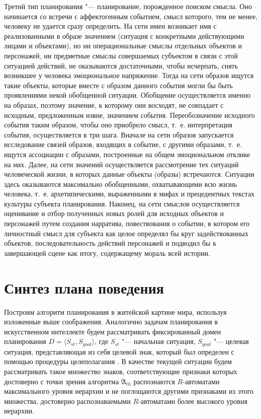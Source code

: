 \documentclass[a4paper, 12pt]{article}
\theoremstyle{break}
\numberwithin{equation}{section}
\begin{document}
	Третий тип планирования "--- планирование, порожденное поиском смысла. Оно начинается со встречи с аффектогенным событием, смысл которого, тем не менее, человеку не удается сразу определить. На сети имен возникает имя с реализованными в образе значением (ситуация с конкретными действующими лицами и объектами), но ни операциональные смыслы отдельных объектов и персонажей, ни предметные смыслы совершаемых субъектом в связи с этой ситуацией действий, не оказываются достаточными, чтобы исчерпать, снять возникшее у человека эмоциональное напряжение. Тогда на сети образов ищутся такие объекты, которые вместе с образом данного события могли бы быть проявлениями некой обобщенной ситуации. Обобщение осуществляется именно на образах, поэтому значение, к которому они восходят, не совпадает с исходным, предложенным извне, значением события. Переобозначение исходного события таким образом, чтобы оно приобрело смысл, т.~е. интерпретация события, осуществляется в три шага. Вначале на сети образов запускается исследование связей образов, входящих в событие, с другими образами, т.~е. ищутся ассоциации с образами, построенные на общем эмоциональном отклике на них. Далее, на сети значений осуществляется рассмотрение тех ситуаций человеческой жизни, в которых данные объекты (образы) встречаются. Ситуации здесь оказываются максимально обобщенными, охватывающими всю жизнь человека, т.~е. архетипическими, выраженными в мифах и прецедентных текстах культуры субъекта планирования. Наконец, на сети смыслов осуществляется оценивание и отбор полученных новых ролей для исходных объектов и персонажей путем создания нарратива, повествования о событии, в котором его личностный смысл для субъекта как целое определял бы круг задействованных объектов, последовательность действий персонажей и подводил бы к завершающей сцене как итогу, содержащему мораль всей истории.

	\section{Синтез плана поведения} \label{sect:plan}
	Построим алгоритм планирования в житейской картине мира, используя изложенные выше соображения. Аналогично задачам планирования в искусственном интеллекте \cite{Fikes1971} будем рассматривать фиксированный домен планирования $D=\langle S_{st},S_{goal} \rangle$, где $S_{st}$ "--- начальная ситуация, $S_{goal}$ "--- целевая ситуация, представляющая из себя целевой знак, который был определен с помощью процедуры целеполагания \cite{PanovA2014a}. В качестве текущей ситуации будем рассматривать такое множество знаков, соответствующие признаки которых достоверно с точки зрения алгоритма $\mathfrak A_{th}$ распознаются $R$-автоматами максимального уровня иерархии и не поглощаются другими признаками из этого множества, достоверно распознаваемыми $R$-автоматами более высокого уровня иерархии.
	
\end{document}
